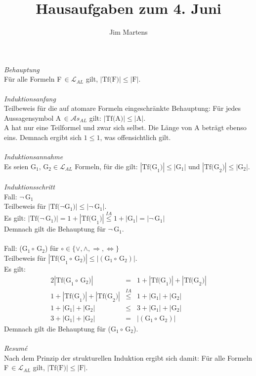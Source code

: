 \documentclass[10pt,a4paper,oneside,ngerman,numbers=noenddot]{scrartcl}
\begin{document}
\author{Jim Martens}
\title{Hausaufgaben zum 4. Juni}
\maketitle

\section{} %
\textit{Behauptung}\\
Für alle Formeln F$\, \in \mathcal{L}_{AL}$ gilt, $|\text{Tf(F)}| \leq |\text{F}|$.\\
\\
\textit{Induktionsanfang}\\
Teilbeweis für die auf atomare Formeln eingeschränkte Behauptung: Für jedes Aussagensymbol
A$\, \in \mathcal{A}s_{AL}$ gilt: $|\text{Tf(A)}| \leq |\text{A}|$.\\
A hat nur eine Teilformel und zwar sich selbst. Die Länge von A beträgt ebenso eins. Demnach ergibt sich $1 \leq 1$, was offensichtlich gilt.\\
\\
\textit{Induktionsannahme}\\
Es seien G$_{1}, \,$G$_{2} \in \mathcal{L}_{AL}$ Formeln, für die gilt: $|\text{Tf(G}_{1}\text{)}| \leq |\text{G}_{1}|$ und $|\text{Tf(G}_{2}\text{)}| \leq |\text{G}_{2}|$.\\
\\
\textit{Induktionsschritt}\\
Fall: $\neg \,$G$_{1}$\\
Teilbeweis für $|\text{Tf(}\neg \text{G}_{1}\text{)}| \leq |\neg \,\text{G}_{1}|$.\\
Es gilt: $|\text{Tf(}\neg \,\text{G}_{1}\text{)}| = 1 + |\text{Tf(G}_{1}\text{)}| \overset{IA}{\leq} 1 + |\text{G}_{1}| = |\neg \,\text{G}_{1}|$\\
Demnach gilt die Behauptung für $\neg \,$G$_{1}$.\\
\\
Fall: (G$_{1} \circ \,$G$_{2}$) für $\circ \in \{\vee, \wedge, \Rightarrow, \Leftrightarrow\}$\\
Teilbeweis für $|\text{Tf(G}_{1} \circ \, \text{G}_{2}\text{)}| \leq |(\text{G}_{1} \circ \,\text{G}_{2})|$.\\
Es gilt:\\
\begin{alignat*}{2}
|\text{Tf(G}_{1} \circ \, \text{G}_{2}\text{)}| &=& 1 + |\text{Tf(G}_{1}\text{)}| + |\text{Tf(G}_{2}\text{)}| \\
1 + |\text{Tf(G}_{1}\text{)}| + |\text{Tf(G}_{2}\text{)}| &\overset{IA}{\leq}& 1 + |\text{G}_{1}| + |\text{G}_{2}| \\
1 + |\text{G}_{1}| + |\text{G}_{2}| &\leq & 3 + |\text{G}_{1}| + |\text{G}_{2}| \\
3 + |\text{G}_{1}| + |\text{G}_{2}| &=& |(\text{G}_{1} \circ \,\text{G}_{2})|
\end{alignat*}
Demnach gilt die Behauptung für (G$_{1} \circ \,$G$_{2}$).\\
\\
\textit{Resumé}\\
Nach dem Prinzip der strukturellen Induktion ergibt sich damit: Für alle Formeln F$\, \in \mathcal{L}_{AL}$
gilt, $|\text{Tf(F)}| \leq |\text{F}|$.
%
%
%
\end{document}

